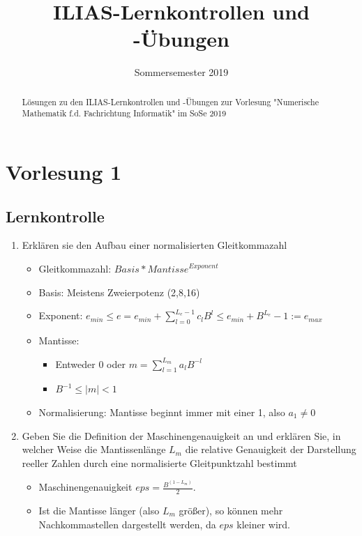 \documentclass[]{article}
\title{ILIAS-Lernkontrollen und -Übungen}
\date{Sommersemester 2019}
\begin{document}
\maketitle

\begin{abstract}
Lösungen zu den ILIAS-Lernkontrollen und -Übungen zur Vorlesung "Numerische Mathematik f.d. Fachrichtung Informatik" im SoSe 2019
\end{abstract}

\section{Vorlesung 1}
\subsection{Lernkontrolle}
\begin{enumerate}
	\item Erklären sie den Aufbau einer normalisierten Gleitkommazahl
		\begin{itemize}
			\item Gleitkommazahl: $\textit{Basis} * \textit{Mantisse}^{\textit{Exponent}}$
			\item Basis: Meistens Zweierpotenz (2,8,16)
			\item Exponent: $e_{min} \leq e = e_{min} + \sum_{l=0}^{L_e - 1}c_l B^l \leq e_{min} + B^{L_e} - 1 := e_{max}$
			\item Mantisse: \begin{itemize}
				\item Entweder 0 oder $m = \sum_{l=1}^{L_m}a_l B^{-l}$
				\item $B^{-1} \leq |m| < 1$
			\end{itemize}
			\item Normalisierung: Mantisse beginnt immer mit einer 1, also $a_1 \neq 0$
		\end{itemize}
	\item Geben Sie die Definition der Maschinengenauigkeit an und erklären Sie, in welcher Weise die Mantissenlänge $L_m$ die relative Genauigkeit der Darstellung reeller Zahlen durch eine normalisierte Gleitpunktzahl bestimmt
		\begin{itemize}
			\item Maschinengenauigkeit $eps = \frac{B^{(1 - L_m)}}{2}$.
			\item Ist die Mantisse länger (also $L_m$ größer), so können mehr Nachkommastellen dargestellt werden, da $eps$ kleiner wird.
		\end{itemize}

\end{enumerate}
\end{document}
